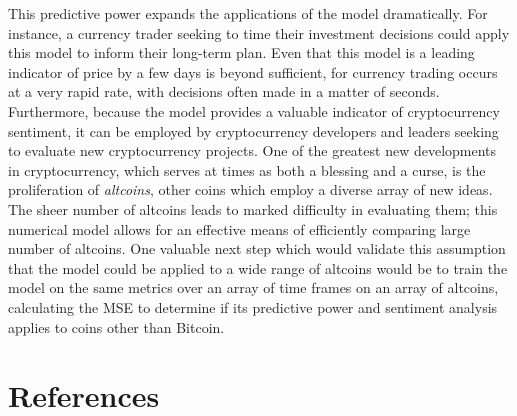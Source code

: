 \documentclass{article}
\begin{document}
This predictive power expands the applications of the model dramatically. For instance, a currency trader seeking to time their investment decisions could apply this model to inform their long-term plan. Even that this model is a leading indicator of price by a few days is beyond sufficient, for currency trading occurs at a very rapid rate, with decisions often made in a matter of seconds. Furthermore, because the model provides a valuable indicator of cryptocurrency sentiment, it can be employed by cryptocurrency developers and leaders seeking to evaluate new cryptocurrency projects. One of the greatest new developments in cryptocurrency, which serves at times as both a blessing and a curse, is the proliferation of \textit{altcoins}, other coins which employ a diverse array of new ideas. The sheer number of altcoins leads to marked difficulty in evaluating them; this numerical model allows for an effective means of efficiently comparing large number of altcoins. One valuable next step which would validate this assumption that the model could be applied to a wide range of altcoins would be to train the model on the same metrics over an array of time frames on an array of altcoins, calculating the MSE to determine if its predictive power and sentiment analysis applies to coins other than Bitcoin.

\newpage
\section{References}
\end{document}
